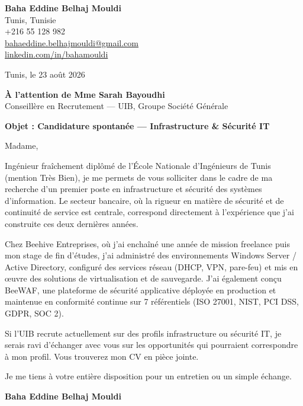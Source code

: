 \documentclass[a4paper,11pt]{article}
\begin{document}
\begin{flushright}
{\bfseries Baha Eddine Belhaj Mouldi}\\
Tunis, Tunisie\\
+216 55 128 982\\
\href{mailto:bahaeddine.belhajmouldi@gmail.com}{bahaeddine.belhajmouldi@gmail.com}\\
\href{https://linkedin.com/in/bahamouldi}{linkedin.com/in/bahamouldi}
\end{flushright}
\vspace{0.8cm}
\begin{flushleft}
Tunis, le 23 ao\^ut 2026
\vspace{0.8cm}

{\bfseries \`A l'attention de Mme Sarah Bayoudhi}\\
Conseill\`ere en Recrutement --- UIB, Groupe Soci\'et\'e G\'en\'erale
\vspace{0.6cm}

{\bfseries Objet : Candidature spontan\'ee --- Infrastructure \& S\'ecurit\'e IT}
\end{flushleft}
\vspace{0.6cm}
Madame,

Ing\'enieur fra\^ichement dipl\^om\'e de l'\'Ecole Nationale d'Ing\'enieurs de Tunis (mention Tr\`es Bien), je me permets de vous solliciter dans le cadre de ma recherche d'un premier poste en infrastructure et s\'ecurit\'e des syst\`emes d'information. Le secteur bancaire, o\`u la rigueur en mati\`ere de s\'ecurit\'e et de continuit\'e de service est centrale, correspond directement \`a l'exp\'erience que j'ai construite ces deux derni\`eres ann\'ees.

Chez Beehive Entreprises, o\`u j'ai encha\^in\'e une ann\'ee de mission freelance puis mon stage de fin d'\'etudes, j'ai administr\'e des environnements Windows Server / Active Directory, configur\'e des services r\'eseau (DHCP, VPN, pare-feu) et mis en \oe uvre des solutions de virtualisation et de sauvegarde. J'ai \'egalement con\c cu BeeWAF, une plateforme de s\'ecurit\'e applicative d\'eploy\'ee en production et maintenue en conformit\'e continue sur 7 r\'ef\'erentiels (ISO 27001, NIST, PCI DSS, GDPR, SOC 2).

Si l'UIB recrute actuellement sur des profils infrastructure ou s\'ecurit\'e IT, je serais ravi d'\'echanger avec vous sur les opportunit\'es qui pourraient correspondre \`a mon profil. Vous trouverez mon CV en pi\`ece jointe.

Je me tiens \`a votre enti\`ere disposition pour un entretien ou un simple \'echange.

\vspace{0.8cm}
\begin{flushright}
{\bfseries Baha Eddine Belhaj Mouldi}
\end{flushright}
\end{document}
